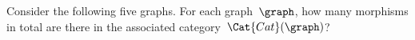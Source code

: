 \vfill\pagebreak

\begin{widepar}
    \begin{gradedexercise}
        \label{ex:HowManyMorphisms}
        Consider the following five graphs.
        For each graph~$\graph$, how many morphisms in total are there in the associated category~$\Cat{Cat}(\graph)$?
    \end{gradedexercise}
\end{widepar}
